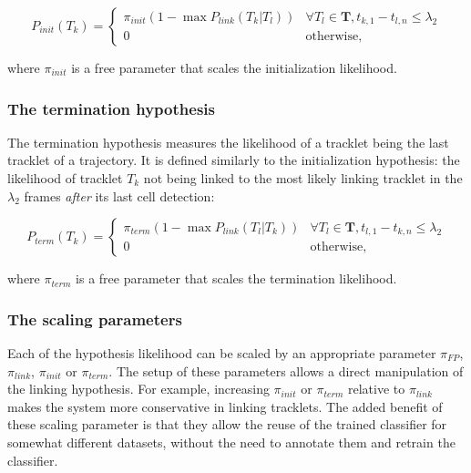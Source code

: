        		\[
       			P_{init}(T_k) = \begin{cases}
       				\pi_{init} (1 - \max{P_{link}(T_k | T_l)}) & \forall T_l \in \textbf{T}, t_{k, 1} - t_{l, n} \leq \lambda_2\\
       				0 & \text{otherwise,}
       			\end{cases}
       		\]
       		
       		\noindent where $\pi_{init}$ is a free parameter that scales the initialization likelihood.

       	\subsubsection{The termination hypothesis \statusfirstdraft}
       		The termination hypothesis measures the likelihood of a tracklet being the last tracklet of a trajectory. It is defined similarly to the initialization hypothesis: the likelihood of tracklet $T_k$ not being linked to the most likely linking tracklet in the $\lambda_2$ frames \textit{after} its last cell detection:
       		
       		\[
     		      P_{term}(T_k) = \begin{cases}
     		      	\pi_{term} (1 - \max{P_{link}(T_l | T_k)}) & \forall T_l \in \textbf{T}, t_{l, 1} - t_{k, n} 	\leq \lambda_2\\
     		      	0 & \text{otherwise,}
     		       	\end{cases}
     		\]
       		       		
       		\noindent where $\pi_{term}$ is a free parameter that scales the termination likelihood.

		\subsubsection{The scaling parameters \statusfirstdraft}
		
		Each of the hypothesis likelihood can be scaled by an appropriate parameter $\pi_{FP}$, $\pi_{link}$, $\pi_{init}$ or $\pi_{term}$. The setup of these parameters allows a direct manipulation of the linking hypothesis. For example, increasing $\pi_{init}$ or $\pi_{term}$ relative to $\pi_{link}$ makes the system more conservative in linking tracklets. The added benefit of these scaling parameter is that they allow the reuse of the trained classifier for somewhat different datasets, without the need to annotate them and retrain the classifier.
	
